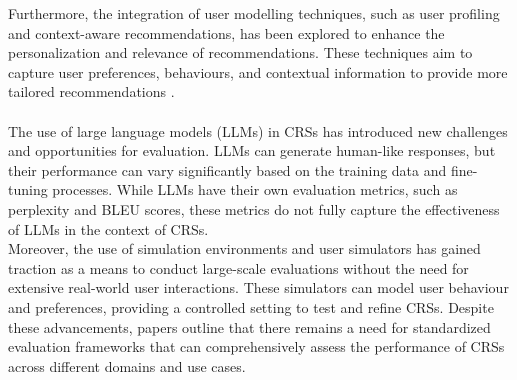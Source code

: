 Furthermore, the integration of user modelling techniques, such as user profiling and context-aware recommendations, has been explored to enhance the personalization and relevance of recommendations. These techniques aim to capture user preferences, behaviours, and contextual information to provide more tailored recommendations \cite{MateosContext2024, Chen2020ACR}.
\\\\
The use of large language models (LLMs) in CRSs has introduced new challenges and opportunities for evaluation. LLMs can generate human-like responses, but their performance can vary significantly based on the training data and fine-tuning processes. 
While LLMs have their own evaluation metrics, such as perplexity and BLEU scores\cite{10.1145/3641289}, these metrics do not fully capture the effectiveness of LLMs in the context of CRSs.
\\
Moreover, the use of simulation environments and user simulators has gained traction\cite{huang2024conceptevaluationprotocol} as a means to conduct large-scale evaluations without the need for extensive real-world user interactions. These simulators can model user behaviour and preferences, providing a controlled setting to test and refine CRSs.
Despite these advancements, papers outline that there remains a need for standardized evaluation frameworks that can comprehensively assess the performance of CRSs across different domains and use cases.





